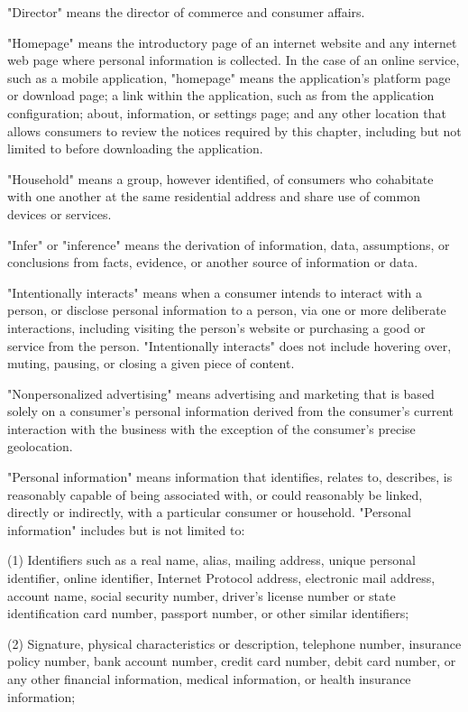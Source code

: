      "Director" means the director of commerce and consumer affairs.

     "Homepage" means the introductory page of an internet website and any internet web page where personal information is collected.  In the case of an online service, such as a mobile application, "homepage" means the application's platform page or download page; a link within the application, such as from the application configuration; about, information, or settings page; and any other location that allows consumers to review the notices required by this chapter, including but not limited to before downloading the application.

     "Household" means a group, however identified, of consumers who cohabitate with one another at the same residential address and share use of common devices or services.

     "Infer" or "inference" means the derivation of information, data, assumptions, or conclusions from facts, evidence, or another source of information or data.

     "Intentionally interacts" means when a consumer intends to interact with a person, or disclose personal information to a person, via one or more deliberate interactions, including visiting the person's website or purchasing a good or service from the person.  "Intentionally interacts" does not include hovering over, muting, pausing, or closing a given piece of content.

     "Nonpersonalized advertising" means advertising and marketing that is based solely on a consumer's personal information derived from the consumer's current interaction with the business with the exception of the consumer's precise geolocation.

     "Personal information" means information that identifies, relates to, describes, is reasonably capable of being associated with, or could reasonably be linked, directly or indirectly, with a particular consumer or household.  "Personal information" includes but is not limited to:

     (1)  Identifiers such as a real name, alias, mailing address, unique personal identifier, online identifier, Internet Protocol address, electronic mail address, account name, social security number, driver's license number or state identification card number, passport number, or other similar identifiers;

     (2)  Signature, physical characteristics or description, telephone number, insurance policy number, bank account number, credit card number, debit card number, or any other financial information, medical information, or health insurance information;

